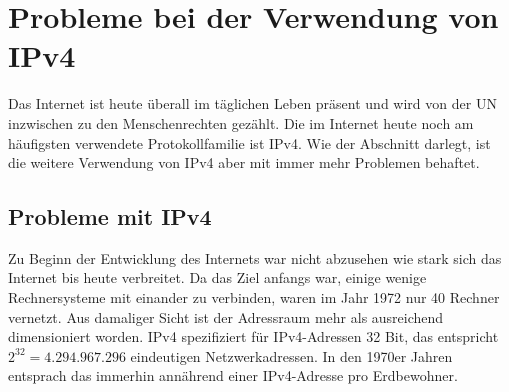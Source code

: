 \documentclass[a4paper,12pt]{scrartcl}
\begin{document}

\clearpage
\section{Probleme bei der Verwendung von IPv4}
\label{sec:1}
Das Internet ist heute überall im täglichen Leben präsent und wird von der UN inzwischen zu den Menschenrechten gezählt.\cite{uninet} Die im Internet heute noch am häufigsten verwendete Protokollfamilie ist IPv4. Wie der Abschnitt  darlegt, ist die weitere Verwendung von IPv4 aber mit immer mehr Problemen behaftet.

\subsection{Probleme mit IPv4}
\label{subsec:1.1}
Zu Beginn der Entwicklung des Internets war nicht abzusehen wie stark sich das Internet bis heute verbreitet. Da das Ziel anfangs war, einige wenige Rechnersysteme mit einander zu verbinden, waren im Jahr 1972 nur 40 Rechner vernetzt.\cite{unikoeln} Aus damaliger Sicht ist der Adressraum mehr als ausreichend dimensioniert worden. IPv4 spezifiziert für IPv4-Adressen 32 Bit, das entspricht $2^{32} = 4.294.967.296$ eindeutigen Netzwerkadressen. In den 1970er Jahren entsprach das immerhin annährend einer IPv4-Adresse pro Erdbewohner.
\end{document}

